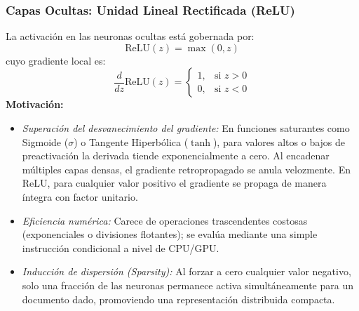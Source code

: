 \documentclass[12pt, a4paper]{article}
\begin{document}
\subsubsection{Capas Ocultas: Unidad Lineal Rectificada (\textbf{ReLU})}
La activación en las neuronas ocultas está gobernada por:
\begin{equation}
    \text{ReLU}(z) = \max(0, z)
\end{equation}
cuyo gradiente local es:
\begin{equation}
    \frac{d}{dz}\text{ReLU}(z) = 
    \begin{cases} 
        1, & \text{si } z > 0 \\ 
        0, & \text{si } z < 0 
    \end{cases}
\end{equation}
\textbf{Motivación:} 
\begin{itemize}
    \item \textit{Superación del desvanecimiento del gradiente:} En funciones saturantes como Sigmoide ($\sigma$) o Tangente Hiperbólica ($\tanh$), para valores altos o bajos de preactivación la derivada tiende exponencialmente a cero. Al encadenar múltiples capas densas, el gradiente retropropagado se anula velozmente. En $\text{ReLU}$, para cualquier valor positivo el gradiente se propaga de manera íntegra con factor unitario.
    \item \textit{Eficiencia numérica:} Carece de operaciones trascendentes costosas (exponenciales o divisiones flotantes); se evalúa mediante una simple instrucción condicional a nivel de CPU/GPU.
    \item \textit{Inducción de dispersión (\textit{Sparsity}):} Al forzar a cero cualquier valor negativo, solo una fracción de las neuronas permanece activa simultáneamente para un documento dado, promoviendo una representación distribuida compacta.
\end{itemize}
\end{document}
